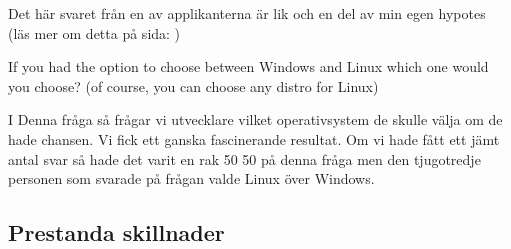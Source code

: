 \documentclass[12pt, a4paper]{report}
\begin{document}
Det här svaret från en av applikanterna är lik och en del av min egen hypotes (läs mer om detta på sida: \pageref{slutsats})


   \vspace{3cm}
 
   \large{If you had the option to choose between Windows and Linux which one would you choose? (of course, you can choose any distro for Linux)}
  
   \vspace{.5cm}
  
   \normalsize I Denna fråga så frågar vi utvecklare vilket operativsystem de skulle välja om de hade chansen. Vi fick ett ganska fascinerande resultat. Om vi hade fått ett jämt antal svar så hade det varit en rak 50 50 på denna fråga men den tjugotredje personen som svarade på frågan valde Linux över Windows.
 
   \vspace{1cm}
 
 
   \cite{form}
 
   \vspace{1cm}

   \subsection{Prestanda skillnader}
\end{document}
